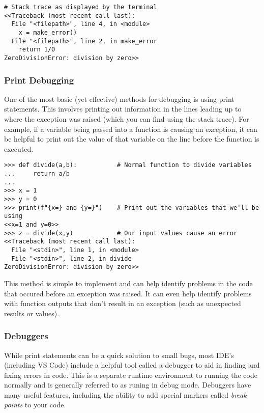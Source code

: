 \begin{lstlisting}
# Stack trace as displayed by the terminal
<<Traceback (most recent call last):
  File "<filepath>", line 4, in <module>
    x = make_error()
  File "<filepath>", line 2, in make_error
    return 1/0
ZeroDivisionError: division by zero>>
\end{lstlisting}

\subsubsection*{Print Debugging} %
One of the most basic (yet effective) methods for debugging is using print statements.
This involves printing out information in the lines leading up to where the exception was raised (which you can find using the stack trace).
For example, if a variable being passed into a function is causing an exception, it can be helpful to print out the value of that variable on the line before the function is executed.

\begin{lstlisting}
>>> def divide(a,b):           # Normal function to divide variables
...     return a/b
...
>>> x = 1
>>> y = 0
>>> print(f"{x=} and {y=}")    # Print out the variables that we'll be using
<<x=1 and y=0>>
>>> z = divide(x,y)            # Our input values cause an error
<<Traceback (most recent call last):
  File "<stdin>", line 1, in <module>
  File "<stdin>", line 2, in divide
ZeroDivisionError: division by zero>>
\end{lstlisting}

This method is simple to implement and can help identify problems in the code that occured before an exception was raised.
It can even help identify problems with function outputs that don't result in an exception (such as unexpected results or values).

\subsubsection*{Debuggers} %
While print statements can be a quick solution to small bugs, most IDE's (including VS Code) include a helpful tool called a debugger to aid in finding and fixing errors in code.
This is a separate runtime environment to running the code normally and is generally referred to as runing in debug mode.
Debuggers have many useful features, including the ability to add special markers called \emph{break points} to your code.

